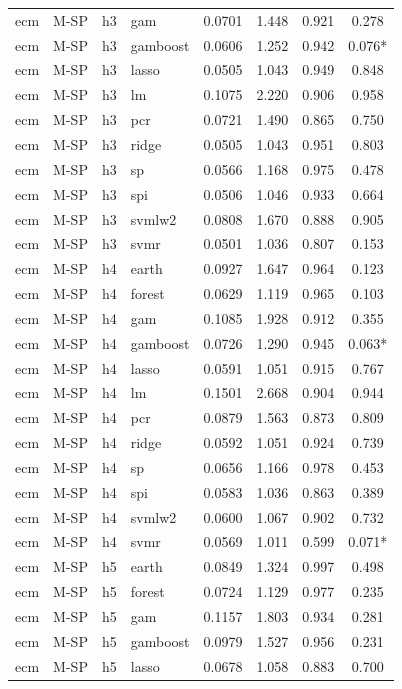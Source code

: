 \begin{ThreePartTable}
\begin{longtable}[t]{llclcccc}
ecm & M-SP & h3 & gam & 0.0701 & 1.448 & 0.921 & 0.278\\
ecm & M-SP & h3 & gamboost & 0.0606 & 1.252 & 0.942 & 0.076*\\
ecm & M-SP & h3 & lasso & 0.0505 & 1.043 & 0.949 & 0.848\\
ecm & M-SP & h3 & lm & 0.1075 & 2.220 & 0.906 & 0.958\\
ecm & M-SP & h3 & pcr & 0.0721 & 1.490 & 0.865 & 0.750\\
ecm & M-SP & h3 & ridge & 0.0505 & 1.043 & 0.951 & 0.803\\
ecm & M-SP & h3 & sp & 0.0566 & 1.168 & 0.975 & 0.478\\
ecm & M-SP & h3 & spi & 0.0506 & 1.046 & 0.933 & 0.664\\
ecm & M-SP & h3 & svmlw2 & 0.0808 & 1.670 & 0.888 & 0.905\\
ecm & M-SP & h3 & svmr & 0.0501 & 1.036 & 0.807 & 0.153\\
\addlinespace
ecm & M-SP & h4 & earth & 0.0927 & 1.647 & 0.964 & 0.123\\
ecm & M-SP & h4 & forest & 0.0629 & 1.119 & 0.965 & 0.103\\
ecm & M-SP & h4 & gam & 0.1085 & 1.928 & 0.912 & 0.355\\
ecm & M-SP & h4 & gamboost & 0.0726 & 1.290 & 0.945 & 0.063*\\
ecm & M-SP & h4 & lasso & 0.0591 & 1.051 & 0.915 & 0.767\\
ecm & M-SP & h4 & lm & 0.1501 & 2.668 & 0.904 & 0.944\\
ecm & M-SP & h4 & pcr & 0.0879 & 1.563 & 0.873 & 0.809\\
ecm & M-SP & h4 & ridge & 0.0592 & 1.051 & 0.924 & 0.739\\
ecm & M-SP & h4 & sp & 0.0656 & 1.166 & 0.978 & 0.453\\
ecm & M-SP & h4 & spi & 0.0583 & 1.036 & 0.863 & 0.389\\
ecm & M-SP & h4 & svmlw2 & 0.0600 & 1.067 & 0.902 & 0.732\\
ecm & M-SP & h4 & svmr & 0.0569 & 1.011 & 0.599 & 0.071*\\
\addlinespace
ecm & M-SP & h5 & earth & 0.0849 & 1.324 & 0.997 & 0.498\\
ecm & M-SP & h5 & forest & 0.0724 & 1.129 & 0.977 & 0.235\\
ecm & M-SP & h5 & gam & 0.1157 & 1.803 & 0.934 & 0.281\\
ecm & M-SP & h5 & gamboost & 0.0979 & 1.527 & 0.956 & 0.231\\
ecm & M-SP & h5 & lasso & 0.0678 & 1.058 & 0.883 & 0.700\\

\end{longtable}
\end{ThreePartTable}
